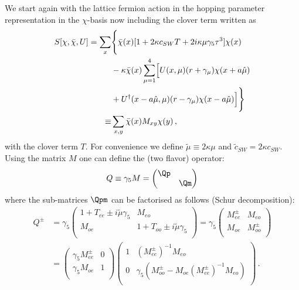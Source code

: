 We start again with the lattice fermion action in the hopping
parameter representation in the $\chi$-basis now including the clover
term written as
\begin{equation}
  \label{eq:eosw0}
    \begin{split}
    S[\chi,\bar\chi,U] = \sum_x & \Biggl\{ \bar\chi(x)[1+2\kappa
    c_{SW}T + 2i \kappa\mu\gamma_5\tau^3]\chi(x)  \Bigr. \\
    & -\kappa\bar\chi(x)\sum_{\mu = 1}^4\Bigl[ U(x,\mu)(r+\gamma_\mu)\chi(x+a\hat\mu)\bigr. \\
    & +\Bigl. \bigl. U^\dagger(x-a\hat\mu,\mu)(r-\gamma_\mu)\chi(x-a\hat\mu)\Bigr]
    \Biggr\} \\
    \equiv &\sum_{x,y}\bar\chi(x) M_{xy}\chi(y)\, ,
  \end{split}
\end{equation}
with the clover term $T$. For convenience we define
$\tilde\mu\equiv2\kappa\mu$ and $\tilde c_{SW} = 2\kappa
c_{SW}$. Using the matrix $M$ one can define the 
(two flavor) operator:
\begin{equation}
  \label{eq:eosw1}
  Q\equiv \gamma_5 M = \begin{pmatrix}
    \Qp & \\\
    & \Qm \\
  \end{pmatrix}
\end{equation}
where the sub-matrices $\Qpm$ can be factorised as follows (Schur
decomposition): 
\begin{equation}
  \label{eq:eosw2}
  \begin{split}
    Q^\pm &= \gamma_5\begin{pmatrix}
      1 + T_{ee} \pm i\tilde\mu\gamma_5 & M_{eo} \\
      M_{oe}    & 1 + T_{oo} \pm i\tilde\mu\gamma_5 \\
    \end{pmatrix} =
    \gamma_5\begin{pmatrix}
      M_{ee}^\pm & M_{eo} \\
      M_{oe}    & M_{oo}^\pm \\
    \end{pmatrix} \\
    & =
    \begin{pmatrix}
      \gamma_5M_{ee}^\pm & 0 \\
      \gamma_5M_{oe}  & 1 \\
    \end{pmatrix}
    \begin{pmatrix}
      1       & (M_{ee}^\pm)^{-1}M_{eo}\\
      0       & \gamma_5(M_{oo}^\pm-M_{oe}(M_{ee}^\pm)^{-1}M_{eo})\\
    \end{pmatrix}\, .
\end{split}
\end{equation}

